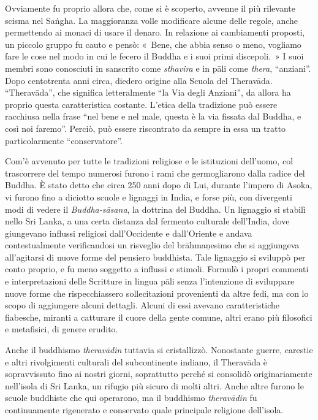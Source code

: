 Ovviamente fu proprio allora che, come si è scoperto, avvenne il più
rilevante scisma nel Saṅgha. La maggioranza volle modificare alcune
delle regole, anche permettendo ai monaci di usare il denaro. In
relazione ai cambiamenti proposti, un piccolo gruppo fu cauto e pensò:
«~Bene, che abbia senso o meno, vogliamo fare le cose nel modo in cui le
fecero il Buddha e i suoi primi discepoli.~» I suoi membri sono
conosciuti in sanscrito come \emph{sthavira} e in pāli come
\emph{thera}, ``anziani''. Dopo centotrenta anni circa, diedero origine
alla Scuola del Theravāda. ``Theravāda'', che significa letteralmente
``la Via degli Anziani'', da allora ha proprio questa caratteristica
costante. L'etica della tradizione può essere racchiusa nella frase
``nel bene e nel male, questa è la via fissata dal Buddha, e così noi
faremo''. Perciò, può essere riscontrato da sempre in essa un tratto
particolarmente ``conservatore''.

Com'è avvenuto per tutte le tradizioni religiose e le istituzioni
dell'uomo, col trascorrere del tempo numerosi furono i rami che
germogliarono dalla radice del Buddha. È stato detto che circa 250 anni
dopo di Lui, durante l'impero di Asoka, vi furono fino a diciotto scuole
e lignaggi in India, e forse più, con divergenti modi di vedere il
\emph{Buddha-sāsana}, la dottrina del Buddha. Un lignaggio si stabilì
nello Sri Lanka, a una certa distanza dal fermento culturale dell'India,
dove giungevano influssi religiosi dall'Occidente e dall'Oriente e
andava contestualmente verificandosi un risveglio del brāhmaṇesimo che
si aggiungeva all'agitarsi di nuove forme del pensiero buddhista. Tale
lignaggio si sviluppò per conto proprio, e fu meno soggetto a influssi e
stimoli. Formulò i propri commenti e interpretazioni delle Scritture in
lingua pāli senza l'intenzione di sviluppare nuove forme che
rispecchiassero sollecitazioni provenienti da altre fedi, ma con lo
scopo di aggiungere alcuni dettagli. Alcuni di essi avevano
caratteristiche fiabesche, miranti a catturare il cuore della gente
comune, altri erano più filosofici e metafisici, di genere erudito.

Anche il buddhismo \emph{theravādin} tuttavia si cristallizzò.
Nonostante guerre, carestie e altri rivolgimenti culturali del
subcontinente indiano, il Theravāda è sopravvissuto fino ai nostri
giorni, soprattutto perché si consolidò originariamente nell'isola di
Sri Lanka, un rifugio più sicuro di molti altri. Anche altre furono le
scuole buddhiste che qui operarono, ma il buddhismo \emph{theravādin} fu
continuamente rigenerato e conservato quale principale religione
dell'isola.

